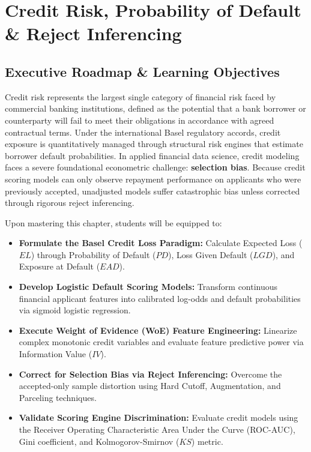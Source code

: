 \chapter{Credit Risk, Probability of Default \& Reject Inferencing}

\section{Executive Roadmap \& Learning Objectives}

Credit risk represents the largest single category of financial risk faced by commercial banking institutions, defined as the potential that a bank borrower or counterparty will fail to meet their obligations in accordance with agreed contractual terms. Under the international Basel regulatory accords, credit exposure is quantitatively managed through structural risk engines that estimate borrower default probabilities. In applied financial data science, credit modeling faces a severe foundational econometric challenge: \textbf{selection bias}. Because credit scoring models can only observe repayment performance on applicants who were previously accepted, unadjusted models suffer catastrophic bias unless corrected through rigorous reject inferencing.

\begin{tcolorbox}[colback=primarylight, colframe=primarydark, title={\textbf{Core Learning Competencies}}]
Upon mastering this chapter, students will be equipped to:
\begin{itemize}
    \item \textbf{Formulate the Basel Credit Loss Paradigm:} Calculate Expected Loss ($EL$) through Probability of Default ($PD$), Loss Given Default ($LGD$), and Exposure at Default ($EAD$).
    \item \textbf{Develop Logistic Default Scoring Models:} Transform continuous financial applicant features into calibrated log-odds and default probabilities via sigmoid logistic regression.
    \item \textbf{Execute Weight of Evidence (WoE) Feature Engineering:} Linearize complex monotonic credit variables and evaluate feature predictive power via Information Value ($IV$).
    \item \textbf{Correct for Selection Bias via Reject Inferencing:} Overcome the accepted-only sample distortion using Hard Cutoff, Augmentation, and Parceling techniques.
    \item \textbf{Validate Scoring Engine Discrimination:} Evaluate credit models using the Receiver Operating Characteristic Area Under the Curve (ROC-AUC), Gini coefficient, and Kolmogorov-Smirnov ($KS$) metric.
\end{itemize}
\end{tcolorbox}

